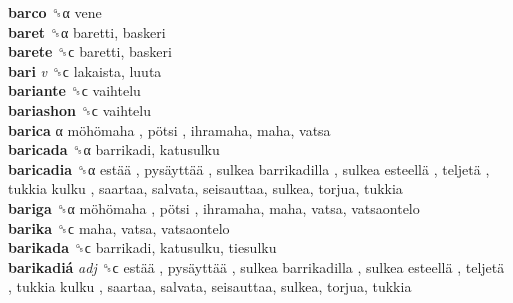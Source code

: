 \textbf{barco} ␝α  vene  \\
\textbf{baret} ␝α  baretti, baskeri  \\
\textbf{barete} ␝ϲ  baretti, baskeri  \\
\textbf{bari} \emph{v}  ␝ϲ  lakaista, luuta  \\
\textbf{bariante} ␝ϲ  vaihtelu  \\
\textbf{bariashon} ␝ϲ  vaihtelu  \\
\textbf{barica} α   möhömaha ,  pötsi , ihramaha, maha, vatsa  \\
\textbf{baricada} ␝α  barrikadi, katusulku  \\
\textbf{baricadia} ␝α   estää ,  pysäyttää ,  sulkea barrikadilla ,  sulkea esteellä ,  teljetä ,  tukkia kulku , saartaa, salvata, seisauttaa, sulkea, torjua, tukkia  \\
\textbf{bariga} ␝α   möhömaha ,  pötsi , ihramaha, maha, vatsa, vatsaontelo  \\
\textbf{barika} ␝ϲ  maha, vatsa, vatsaontelo  \\
\textbf{barikada} ␝ϲ  barrikadi, katusulku, tiesulku  \\
\textbf{barikadiá} \emph{adj}  ␝ϲ   estää ,  pysäyttää ,  sulkea barrikadilla ,  sulkea esteellä ,  teljetä ,  tukkia kulku , saartaa, salvata, seisauttaa, sulkea, torjua, tukkia  \\
